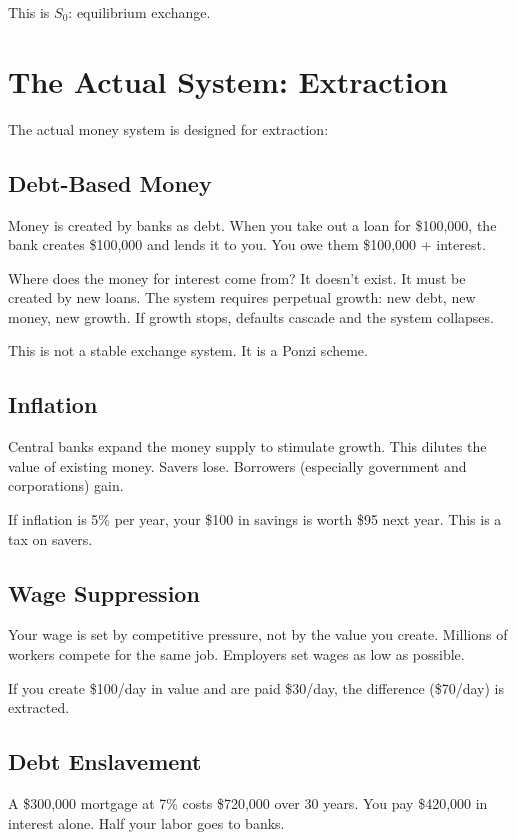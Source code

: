\documentclass[12pt]{article}
\begin{document}
This is $S_0$: equilibrium exchange.

\section{The Actual System: Extraction}

The actual money system is designed for extraction:

\subsection{Debt-Based Money}

Money is created by banks as debt. When you take out a loan for \$100,000, the bank creates \$100,000 and lends it to you. You owe them \$100,000 + interest.

Where does the money for interest come from? It doesn't exist. It must be created by new loans. The system requires perpetual growth: new debt, new money, new growth. If growth stops, defaults cascade and the system collapses.

This is not a stable exchange system. It is a Ponzi scheme.

\subsection{Inflation}

Central banks expand the money supply to stimulate growth. This dilutes the value of existing money. Savers lose. Borrowers (especially government and corporations) gain.

If inflation is 5\% per year, your \$100 in savings is worth \$95 next year. This is a tax on savers.

\subsection{Wage Suppression}

Your wage is set by competitive pressure, not by the value you create. Millions of workers compete for the same job. Employers set wages as low as possible.

If you create \$100/day in value and are paid \$30/day, the difference (\$70/day) is extracted.

\subsection{Debt Enslavement}

A \$300,000 mortgage at 7\% costs \$720,000 over 30 years. You pay \$420,000 in interest alone. Half your labor goes to banks.
\end{document}
